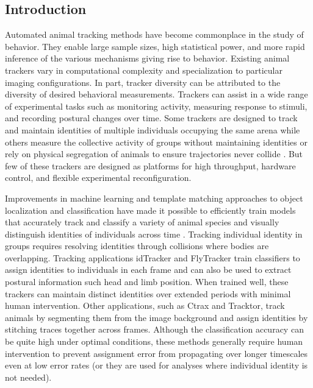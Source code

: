 \documentclass[10pt]{article}
\begin{document}
\vspace{1cm}
\begin{multicols}{2}
\section*{Introduction}

Automated animal tracking methods have become commonplace in the study of behavior. They enable large sample sizes, high statistical power, and more rapid inference of the various mechanisms giving rise to behavior. Existing animal trackers vary in computational complexity and specialization to particular imaging configurations. In part, tracker diversity can be attributed to the diversity of desired behavioral measurements. Trackers can assist in a wide range of experimental tasks such as monitoring activity, measuring response to stimuli\cite{Fry_TrackFly_2008,Donelson_High_2012}, and recording postural changes over time\cite{Mathis_DeepLabCut_2018,Pereira_Fast_2018}. Some trackers are designed to track and maintain identities of multiple individuals occupying the same arena \cite{Prez-Escudero_idTracker_2014,Eyjolfsdottir_Detecting_2014,Rodriguez_ToxId_2017} while others measure the collective activity of groups without maintaining identities or rely on physical segregation of animals to ensure trajectories never collide \cite{Ramot_The_2008,Swierczek_High_2011,Itskovits_A_2017}. But few of these trackers are designed as platforms for high throughput, hardware control, and flexible experimental reconfiguration. 

Improvements in machine learning and template matching approaches to object localization and classification have made it possible to efficiently train models that accurately track and classify a variety of animal species and visually distinguish identities of individuals across time \cite{Eyjolfsdottir_Detecting_2014,Prez-Escudero_idTracker_2014}. Tracking individual identity in groups requires resolving identities through collisions where bodies are overlapping. Tracking applications idTracker and FlyTracker train classifiers to assign identities to individuals in each frame and can also be used to extract postural information such head and limb position. When trained well, these trackers can maintain distinct identities over extended periods with minimal human intervention. Other applications, such as Ctrax and Tracktor\cite{Branson_High_2009,Rodriguez_ToxId_2017,Sridhar_Tracktor_2018}, track animals by segmenting them from the image background and assign identities by stitching traces together across frames. Although the classification accuracy can be quite high under optimal conditions, these methods generally require human intervention to prevent assignment error from propagating over longer timescales even at low error rates (or they are used for analyses where individual identity is not needed). 


\end{multicols}
\end{document}
